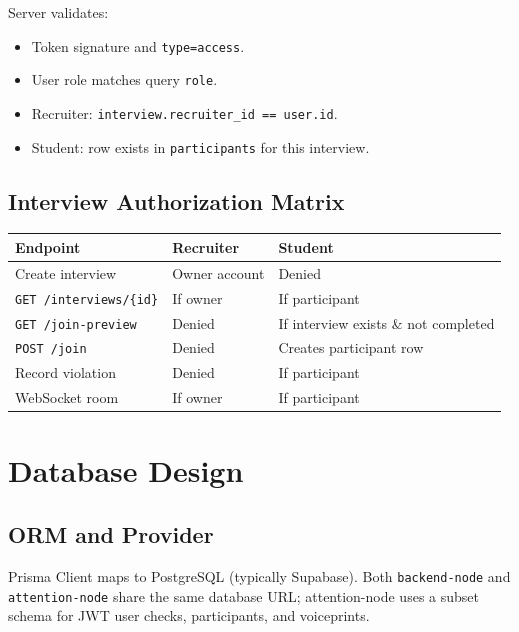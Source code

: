 \documentclass[11pt,a4paper]{report}
\begin{document}
Server validates:
\begin{itemize}
  \item Token signature and \texttt{type=access}.
  \item User role matches query \texttt{role}.
  \item Recruiter: \texttt{interview.recruiter\_id == user.id}.
  \item Student: row exists in \texttt{participants} for this interview.
\end{itemize}

\section{Interview Authorization Matrix}

\begin{table}[H]
\centering
\small
\begin{tabularx}{\textwidth}{@{}lXX@{}}
\toprule
\textbf{Endpoint} & \textbf{Recruiter} & \textbf{Student} \\
\midrule
Create interview & Owner account & Denied \\
\texttt{GET /interviews/\{id\}} & If owner & If participant \\
\texttt{GET /join-preview} & Denied & If interview exists \& not completed \\
\texttt{POST /join} & Denied & Creates participant row \\
Record violation & Denied & If participant \\
WebSocket room & If owner & If participant \\
\bottomrule
\end{tabularx}
\end{table}

\chapter{Database Design}

\section{ORM and Provider}
Prisma Client maps to PostgreSQL (typically Supabase). Both \texttt{backend-node} and \texttt{attention-node} share the same database URL; attention-node uses a subset schema for JWT user checks, participants, and voiceprints.
\end{document}
